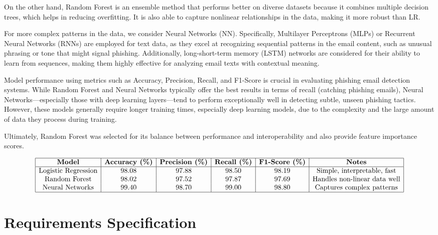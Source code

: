 \documentclass{article}
\begin{document}
On the other hand, Random Forest is an ensemble method that performs better on diverse datasets because it combines multiple decision trees, which helps in reducing overfitting. It is also able to capture nonlinear relationships in the data, making it more robust than LR.

For more complex patterns in the data, we consider Neural Networks (NN). Specifically, Multilayer Perceptrons (MLPs) or Recurrent Neural Networks (RNNs) are employed for text data, as they excel at recognizing sequential patterns in the email content, such as unusual phrasing or tone that might signal phishing. Additionally, long-short-term memory (LSTM) networks are considered for their ability to learn from sequences, making them highly effective for analyzing email texts with contextual meaning.

Model performance using metrics such as Accuracy, Precision, Recall, and F1-Score is crucial in evaluating phishing email detection systems. While Random Forest and Neural Networks typically offer the best results in terms of recall (catching phishing emails), Neural Networks—especially those with deep learning layers—tend to perform exceptionally well in detecting subtle, unseen phishing tactics. However, these models generally require longer training times, especially deep learning models, due to the complexity and the large amount of data they process during training.

Ultimately, Random Forest was selected for its balance between performance and interoperability and also provide feature importance scores.

\[
\begin{array}{|c|c|c|c|c|c|}
\hline
\textbf{Model} & \textbf{Accuracy (\%)} & \textbf{Precision (\%)} & \textbf{Recall (\%)} & \textbf{F1-Score (\%)} & \textbf{Notes} \\
\hline
\text{Logistic Regression} & 98.08 & 97.88 & 98.50 & 98.19 & \text{Simple, interpretable, fast} \\
\text{Random Forest} & 98.02 & 97.52 & 97.87 & 97.69 & \text{Handles non-linear data well} \\
\text{Neural Networks} & 99.40 & 98.70 & 99.00 & 98.80 & \text{Captures complex patterns} \\
\hline
\end{array}
\]
\newpage


\section{Requirements Specification}
\end{document}
